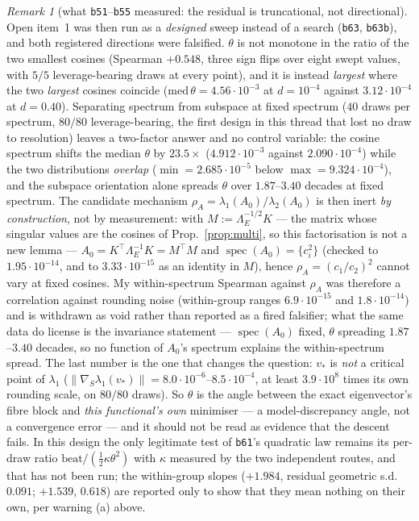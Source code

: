 \documentclass[11pt]{article}
\theoremstyle{remark}
\newtheorem{remark}{Remark}[section]
\newcommand{\Le}{\Lambda_E}
\begin{document}
\begin{remark}[what \texttt{b51}--\texttt{b55} measured: the residual is truncational, not directional]
Open item~1 was then run as a \emph{designed} sweep instead of a search (\texttt{b63},
\texttt{b63b}), and both registered directions were falsified. $\theta$ is not monotone in the ratio of
the two smallest cosines (Spearman $+0.548$, three sign flips over eight swept values, with $5/5$
leverage-bearing draws at every point), and it is instead \emph{largest} where the two \emph{largest}
cosines coincide ($\mathrm{med}\,\theta=4.56\cdot10^{-3}$ at $d=10^{-4}$ against $3.12\cdot10^{-4}$ at
$d=0.40$). Separating spectrum from subspace at fixed spectrum ($40$ draws per spectrum, $80/80$
leverage-bearing, the first design in this thread that lost no draw to resolution) leaves a two-factor
answer and no control variable: the cosine spectrum shifts the median $\theta$ by $23.5\times$
($4.912\cdot10^{-3}$ against $2.090\cdot10^{-4}$) while the two distributions \emph{overlap}
($\min=2.685\cdot10^{-5}$ below $\max=9.324\cdot10^{-4}$), and the subspace orientation alone spreads
$\theta$ over $1.87$--$3.40$ decades at fixed spectrum. The candidate mechanism
$\rho_A=\lambda_1(A_0)/\lambda_2(A_0)$ is then inert \emph{by construction}, not by measurement: with
$M:=\Le^{-1/2}K$ --- the matrix whose singular values are the cosines of Prop.~\ref{prop:multi}, so this
factorisation is not a new lemma --- $A_0=K^{\top}\Le^{-1}K=M^{\top}M$ and $\operatorname{spec}(A_0)=\{c_i^2\}$
(checked to $1.95\cdot10^{-14}$, and to $3.33\cdot10^{-15}$ as an identity in $M$), hence
$\rho_A=(c_1/c_2)^2$ cannot vary at fixed cosines. My within-spectrum Spearman against $\rho_A$ was
therefore a correlation against rounding noise (within-group ranges $6.9\cdot10^{-15}$ and
$1.8\cdot10^{-14}$) and is withdrawn
as void rather than reported as a fired falsifier; what the same data do license is the invariance
statement --- $\operatorname{spec}(A_0)$ fixed, $\theta$ spreading $1.87$--$3.40$ decades, so no function
of $A_0$'s spectrum explains the within-spectrum spread. The last number is the one that changes the
question: $v_\ast$ is \emph{not} a critical point of $\lambda_1$
($\|\nabla_{\!S}\lambda_1(v_\ast)\|=8.0\cdot10^{-6}$--$8.5\cdot10^{-4}$, at least $3.9\cdot10^{8}$
times its own rounding scale, on $80/80$ draws). So $\theta$ is the angle between the exact eigenvector's
fibre block and \emph{this functional's own} minimiser --- a model-discrepancy angle, not a convergence
error --- and it should not be read as evidence that the descent fails. In this design the only
legitimate test of \texttt{b61}'s quadratic law remains its per-draw ratio
$\mathrm{beat}/(\tfrac12\kappa\theta^2)$ with $\kappa$ measured by the two independent routes, and that
has not been run; the within-group slopes ($+1.984$, residual geometric s.d.\ $0.091$; $+1.539$,
$0.618$) are reported only to show that they mean nothing on their own, per warning (a) above.
\end{remark}
\end{document}
